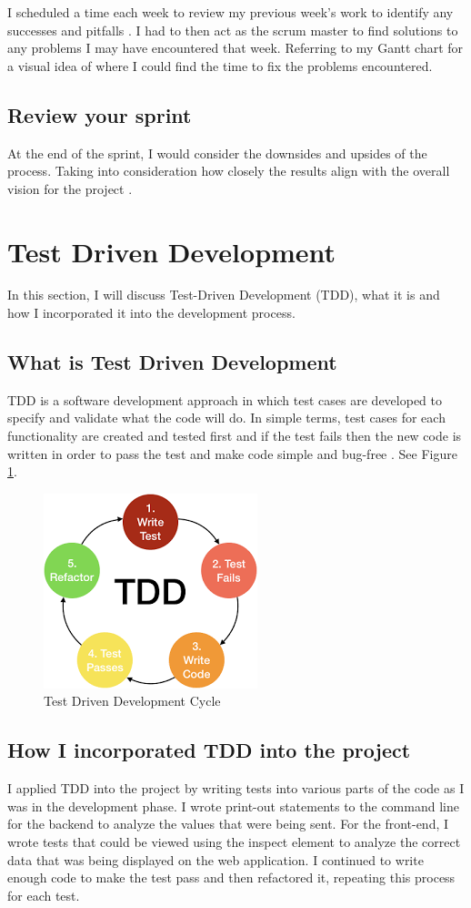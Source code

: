 I scheduled a time each week to review my previous week's work to identify any successes and pitfalls \cite{Scrum}. I had to then act as the scrum master to find solutions to any problems I may have encountered that week. Referring to my Gantt chart for a visual idea of where I could find the time to fix the problems encountered.

\subsection{Review your sprint}
At the end of the sprint, I would consider the downsides and upsides of the process. Taking into consideration how closely the results align with the overall vision for the project \cite{Scrum}. 

\section{Test Driven Development}
In this section, I will discuss Test-Driven Development (TDD), what it is and how I incorporated it into the development process.

\subsection{What is Test Driven Development}
TDD is a software development approach in which test cases are developed to specify and validate what the code will do. In simple terms, test cases for each functionality are created and tested first and if the test fails then the new code is written in order to pass the test and make code simple and bug-free \cite{TDD}. See Figure \ref{TDD}.

\begin{figure}[h]
\centering
\includegraphics[scale=0.5]{img/TDD.png}
\caption{Test Driven Development Cycle}
\label{TDD}
\end{figure}

\subsection{How I incorporated TDD into the project}
I applied TDD into the project by writing tests into various parts of the code as I was in the development phase. I wrote print-out statements to the command line for the backend to analyze the values that were being sent. For the front-end, I wrote tests that could be viewed using the inspect element to analyze the correct data that was being displayed on the web application. I continued to write enough code to make the test pass and then refactored it, repeating this process for each test. 

